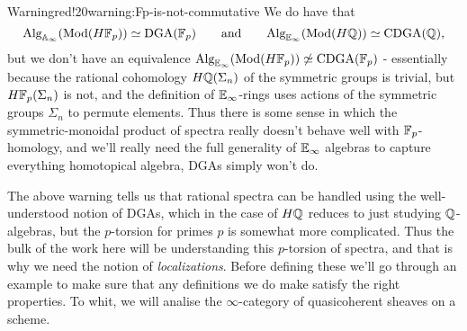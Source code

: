 \begin{env}{Warning}{red!20}{warning:Fp-is-not-commutative}
We do have that
	\[
	{\text{Alg}}_{\mathbb{A}_\infty}({\text{Mod}}(H\mathbb{F}_p)) \simeq \text{DGA}(\mathbb{F}_p)
	\qquad\text{and}\qquad
	{\text{Alg}}_{\mathbb{E}_\infty}({\text{Mod}}(H\mathbb{Q})) \simeq \text{CDGA}(\mathbb{Q}),
	\]
but we don't have an equivalence ${\text{Alg}}_{\mathbb{E}_\infty}({\text{Mod}}(H\mathbb{F}_p)) \not\simeq \text{CDGA}(\mathbb{F}_p)$ - essentially because the rational cohomology $H\mathbb{Q}(\Sigma_n)$ of the symmetric groups is trivial, but $H\mathbb{F}_p(\Sigma_n)$ is not, and the definition of $\mathbb{E}_\infty$-rings uses actions of the symmetric groups $\Sigma_n$ to permute elements. Thus there is some sense in which the symmetric-monoidal product of spectra really doesn't behave well with $\mathbb{F}_p$-homology, and we'll really need the full generality of $\mathbb{E}_\infty$ algebras to capture everything homotopical algebra, DGAs simply won't do.
\end{env}

The above warning tells us that rational spectra can be handled using the well-understood notion of DGAs, which in the case of $H\mathbb{Q}$ reduces to just studying $\mathbb{Q}$-algebras, but the $p$-torsion for primes $p$ is somewhat more complicated. Thus the bulk of the work here will be understanding this $p$-torsion of spectra, and that is why we need the notion of \textit{localizations}. Before defining these we'll go through an example to make sure that any definitions we do make satisfy the right properties. To whit, we will analise the $\infty$-category of quasicoherent sheaves on a scheme. 



\newpage

